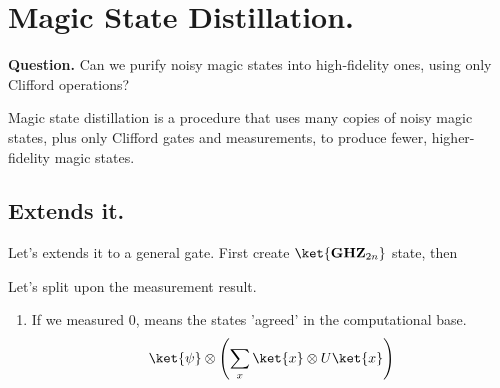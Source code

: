 \documentclass[12pt,a4paper]{article}
\begin{document}
\section{Magic State Distillation.}

\textbf{Question.} Can we purify noisy magic states into high-fidelity ones, using only Clifford operations?

Magic state distillation is a procedure that uses many copies of noisy magic states, plus only Clifford gates and measurements, to produce fewer, higher-fidelity magic states.

\ifdefined\DEBUG
\subsection{Extends it.}

Let's extends it to a general gate. First create $\ket{\textbf{GHZ}_{2n}}$ state, then 

Let's split upon the measurement result. 
\begin{enumerate}
    \item If we measured $0$, means the states 'agreed' in the computational base. 
      \begin{equation*}
    \begin{split}
          \ket{\psi} \otimes \left( \sum_x\ket{x}\otimes U\ket{x} \right)
    \end{split}
\end{equation*}
\end{enumerate}

\else
\fi


\printbibliography 
\end{document}
